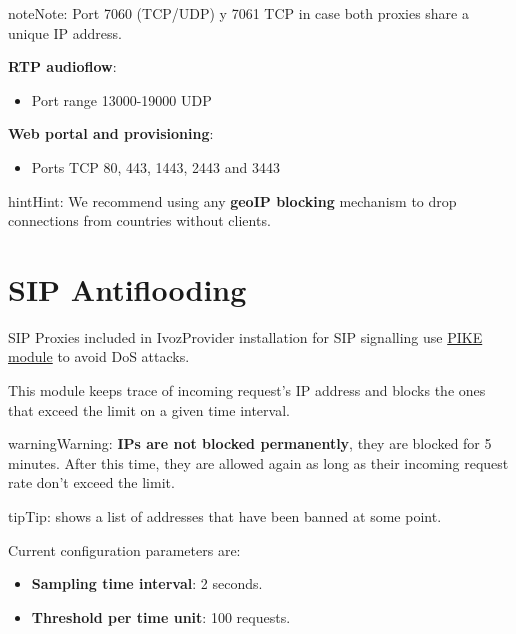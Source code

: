 \documentclass[letterpaper,10pt,english]{sphinxmanual}
\begin{document}
\begin{notice}{note}{Note:}
Port 7060 (TCP/UDP) y 7061 TCP in case both proxies share a unique IP address.
\end{notice}

\textbf{RTP audioflow}:
\begin{itemize}
\item {} 
Port range 13000-19000 UDP

\end{itemize}

\textbf{Web portal and provisioning}:
\begin{itemize}
\item {} 
Ports TCP 80, 443, 1443, 2443 and 3443

\end{itemize}

\begin{notice}{hint}{Hint:}
We recommend using any \textbf{geoIP blocking} mechanism to drop connections from
countries without clients.
\end{notice}


\section{SIP Antiflooding}
\label{security_and_maintenance/security/antiflooding::doc}\label{security_and_maintenance/security/antiflooding:sip-antiflooding}
SIP Proxies included in IvozProvider installation for SIP signalling use
\href{http://kamailio.org/docs/modules/5.1.x/modules/pike.html}{PIKE module} to avoid DoS attacks.

This module keeps trace of incoming request's IP address and blocks the ones that exceed the limit on a given time
interval.

\begin{notice}{warning}{Warning:}
\textbf{IPs are not blocked permanently}, they are blocked for 5 minutes. After this time, they are allowed again
as long as their incoming request rate don't exceed the limit.
\end{notice}

\begin{notice}{tip}{Tip:}
{\hyperref[administration_portal/platform/antiflood_banned_ips:antiflood\string-banned\string-ips]{}} shows a list of addresses that have been banned at some point.
\end{notice}

Current configuration parameters are:
\begin{itemize}
\item {} 
\textbf{Sampling time interval}: 2 seconds.

\item {} 
\textbf{Threshold per time unit}: 100 requests.

\end{itemize}
\end{document}
